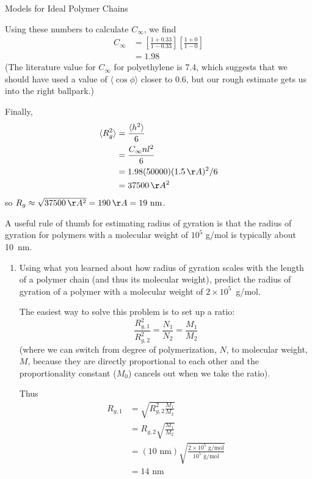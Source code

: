 \begin{activity}{Models for Ideal Polymer Chains}
\begin{exercises}
\begin{solution}{}
			Using these numbers to calculate $C_\infty$, we find
			\begin{align*}
				C_\infty &= \left[\frac{1+0.33}{1-0.33}\right]\left[\frac{1+0}{1-0}\right]\\
				&= 1.98
			\end{align*}
			(The literature value for $C_\infty$ for polyethylene is 7.4, which suggests that we should have used a value of $\langle\cos\phi\rangle$ closer to 0.6, but our rough estimate gets us into the right ballpark.)
			
			Finally,
			\begin{align*}
				\langle R_g^2\rangle &= \frac{\langle h^2\rangle}{6}\\
				&= \frac{C_\infty n l^2}{6} \\
				&= 1.98(50000)(1.5\,\AA)^2/6\\
				&= 37500\,\AA^2
			\end{align*}
			so $R_g \approx \sqrt{37500\,\AA^2} = 190\,\AA = 19\text{ nm}$.
		\end{solution}

	\exercise A useful rule of thumb for estimating radius of gyration is that the radius of gyration for polymers with a molecular weight of $10^5$ g/mol is typically about 10~nm.
	
		\begin{enumerate}
			\item Using what you learned about how radius of gyration scales with the length of a polymer chain (and thus its molecular weight), predict the radius of gyration of a polymer with a molecular weight of $2\times10^5$~g/mol.
	
		\begin{solution}{}
			The easiest way to solve this problem is to set up a ratio:
				\begin{equation*}
					\frac{R_{g,1}^2}{R_{g,2}^2} = \frac{N_1}{N_2} = \frac{M_1}{M_2}
				\end{equation*}
				(where we can switch from degree of polymerization, $N$, to molecular weight, $M$, because they are directly proportional to each other and the proportionality constant ($M_0$) cancels out when we take the ratio).
				
			Thus
			\begin{align*}
				R_{g,1} &= \sqrt{ R_{g,2}^2 \frac{M_1}{M_2} }\\
					&= R_{g,2} \sqrt{\frac{M_1}{M_2}}\\
					&= (10\text{ nm})\sqrt{\frac{2\times 10^5\text{ g/mol}}{10^5\text{ g/mol}}}\\
					&= 14\text{ nm}
			\end{align*}
		\end{solution}
			

\end{enumerate}
\end{exercises}
\end{activity}

